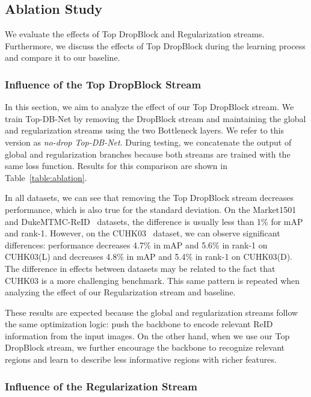 \documentclass[a4paper,conference]{IEEEtran}
\begin{document}
\subsection{Ablation Study}
 
We evaluate the effects of Top DropBlock and Regularization streams. Furthermore, we discuss the effects of Top DropBlock during the learning process and compare it to our baseline.
 
\subsubsection{\textbf{Influence of the Top DropBlock Stream}}
 
In this section, we aim to analyze the effect of our Top DropBlock stream. We train Top-DB-Net by removing the DropBlock stream and maintaining the global and regularization streams using the two Bottleneck layers. We refer to this version as \textit{no-drop Top-DB-Net}. During testing, we concatenate the output of global and regularization branches because both streams are trained with the same loss function. Results for this comparison are shown in Table~\ref{table:ablation}.
 
In all datasets, we can see that removing the Top DropBlock stream decreases performance, which is also true for the standard deviation. On the Market1501~\cite{zheng2015scalable} and DukeMTMC-ReID~\cite{zheng2017unlabeled,ristani2016MTMC} datasets, the difference is usually less than 1\% for mAP and rank-1. However, on the CUHK03~\cite{li2014deepReID,zhong2017re} dataset, we can observe significant differences: performance decreases 4.7\% in mAP and 5.6\% in rank-1 on CUHK03(L) and decreases 4.8\% in mAP and 5.4\% in rank-1 on CUHK03(D). The difference in effects between datasets may be related to the fact that CUHK03 is a more challenging benchmark. This same pattern is repeated when analyzing the effect of our Regularization stream and baseline.
 
These results are expected because the global and regularization streams follow the same optimization logic: push the backbone to encode relevant ReID information from the input images. On the other hand, when we use our Top DropBlock stream, we further encourage the backbone to recognize relevant regions and learn to describe less informative regions with richer features.
 
\subsubsection{\textbf{Influence of the Regularization Stream}}
 
\end{document}
